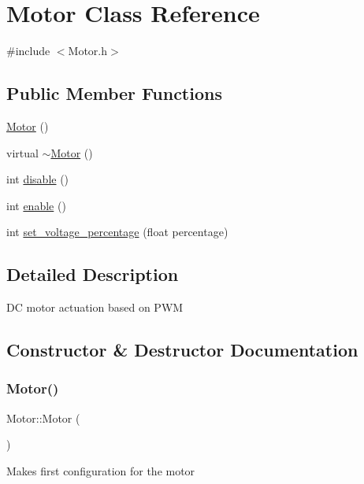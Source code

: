 \hypertarget{classMotor}{}\section{Motor Class Reference}
\label{classMotor}


{\ttfamily \#include $<$Motor.\+h$>$}

\subsection*{Public Member Functions}
\begin{DoxyCompactItemize}
\item 
\mbox{\hyperlink{classMotor_af6106b4c506411265c5face762b6c004}{Motor}} ()
\item 
virtual \mbox{\hyperlink{classMotor_a2e57c7b2681efea1d3b7f253ee88ecd4}{$\sim$\+Motor}} ()
\item 
int \mbox{\hyperlink{classMotor_ac019bca262791cea21e1c84c9156d199}{disable}} ()
\item 
int \mbox{\hyperlink{classMotor_aff58309122a4ba7ea4d037e288c9192f}{enable}} ()
\item 
int \mbox{\hyperlink{classMotor_a7fda59cead716e5cd5ce252741d3d47b}{set\+\_\+voltage\+\_\+percentage}} (float percentage)
\end{DoxyCompactItemize}


\subsection{Detailed Description}
DC motor actuation based on P\+WM 

\subsection{Constructor \& Destructor Documentation}
\mbox{\label{classMotor_af6106b4c506411265c5face762b6c004}} 
\subsubsection{\texorpdfstring{Motor()}{Motor()}}
{\footnotesize\ttfamily Motor\+::\+Motor (\begin{DoxyParamCaption}{ }\end{DoxyParamCaption})}

Makes first configuration for the motor \mbox{\label{classMotor_a2e57c7b2681efea1d3b7f253ee88ecd4}} 

